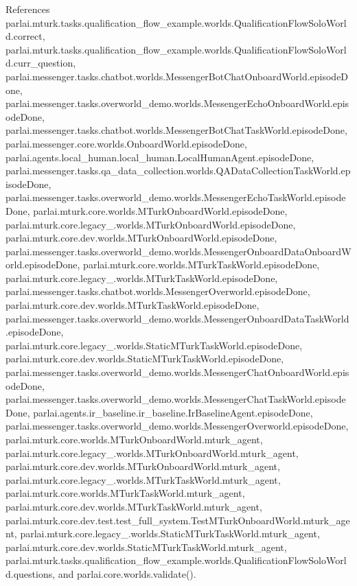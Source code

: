 References parlai.\+mturk.\+tasks.\+qualification\+\_\+flow\+\_\+example.\+worlds.\+Qualification\+Flow\+Solo\+World.\+correct, parlai.\+mturk.\+tasks.\+qualification\+\_\+flow\+\_\+example.\+worlds.\+Qualification\+Flow\+Solo\+World.\+curr\+\_\+question, parlai.\+messenger.\+tasks.\+chatbot.\+worlds.\+Messenger\+Bot\+Chat\+Onboard\+World.\+episode\+Done, parlai.\+messenger.\+tasks.\+overworld\+\_\+demo.\+worlds.\+Messenger\+Echo\+Onboard\+World.\+episode\+Done, parlai.\+messenger.\+tasks.\+chatbot.\+worlds.\+Messenger\+Bot\+Chat\+Task\+World.\+episode\+Done, parlai.\+messenger.\+core.\+worlds.\+Onboard\+World.\+episode\+Done, parlai.\+agents.\+local\+\_\+human.\+local\+\_\+human.\+Local\+Human\+Agent.\+episode\+Done, parlai.\+messenger.\+tasks.\+qa\+\_\+data\+\_\+collection.\+worlds.\+Q\+A\+Data\+Collection\+Task\+World.\+episode\+Done, parlai.\+messenger.\+tasks.\+overworld\+\_\+demo.\+worlds.\+Messenger\+Echo\+Task\+World.\+episode\+Done, parlai.\+mturk.\+core.\+worlds.\+M\+Turk\+Onboard\+World.\+episode\+Done, parlai.\+mturk.\+core.\+legacy\+\_.\+worlds.\+M\+Turk\+Onboard\+World.\+episode\+Done, parlai.\+mturk.\+core.\+dev.\+worlds.\+M\+Turk\+Onboard\+World.\+episode\+Done, parlai.\+messenger.\+tasks.\+overworld\+\_\+demo.\+worlds.\+Messenger\+Onboard\+Data\+Onboard\+World.\+episode\+Done, parlai.\+mturk.\+core.\+worlds.\+M\+Turk\+Task\+World.\+episode\+Done, parlai.\+mturk.\+core.\+legacy\+\_.\+worlds.\+M\+Turk\+Task\+World.\+episode\+Done, parlai.\+messenger.\+tasks.\+chatbot.\+worlds.\+Messenger\+Overworld.\+episode\+Done, parlai.\+mturk.\+core.\+dev.\+worlds.\+M\+Turk\+Task\+World.\+episode\+Done, parlai.\+messenger.\+tasks.\+overworld\+\_\+demo.\+worlds.\+Messenger\+Onboard\+Data\+Task\+World.\+episode\+Done, parlai.\+mturk.\+core.\+legacy\+\_.\+worlds.\+Static\+M\+Turk\+Task\+World.\+episode\+Done, parlai.\+mturk.\+core.\+dev.\+worlds.\+Static\+M\+Turk\+Task\+World.\+episode\+Done, parlai.\+messenger.\+tasks.\+overworld\+\_\+demo.\+worlds.\+Messenger\+Chat\+Onboard\+World.\+episode\+Done, parlai.\+messenger.\+tasks.\+overworld\+\_\+demo.\+worlds.\+Messenger\+Chat\+Task\+World.\+episode\+Done, parlai.\+agents.\+ir\+\_\+baseline.\+ir\+\_\+baseline.\+Ir\+Baseline\+Agent.\+episode\+Done, parlai.\+messenger.\+tasks.\+overworld\+\_\+demo.\+worlds.\+Messenger\+Overworld.\+episode\+Done, parlai.\+mturk.\+core.\+worlds.\+M\+Turk\+Onboard\+World.\+mturk\+\_\+agent, parlai.\+mturk.\+core.\+legacy\+\_.\+worlds.\+M\+Turk\+Onboard\+World.\+mturk\+\_\+agent, parlai.\+mturk.\+core.\+dev.\+worlds.\+M\+Turk\+Onboard\+World.\+mturk\+\_\+agent, parlai.\+mturk.\+core.\+legacy\+\_.\+worlds.\+M\+Turk\+Task\+World.\+mturk\+\_\+agent, parlai.\+mturk.\+core.\+worlds.\+M\+Turk\+Task\+World.\+mturk\+\_\+agent, parlai.\+mturk.\+core.\+dev.\+worlds.\+M\+Turk\+Task\+World.\+mturk\+\_\+agent, parlai.\+mturk.\+core.\+dev.\+test.\+test\+\_\+full\+\_\+system.\+Test\+M\+Turk\+Onboard\+World.\+mturk\+\_\+agent, parlai.\+mturk.\+core.\+legacy\+\_.\+worlds.\+Static\+M\+Turk\+Task\+World.\+mturk\+\_\+agent, parlai.\+mturk.\+core.\+dev.\+worlds.\+Static\+M\+Turk\+Task\+World.\+mturk\+\_\+agent, parlai.\+mturk.\+tasks.\+qualification\+\_\+flow\+\_\+example.\+worlds.\+Qualification\+Flow\+Solo\+World.\+questions, and parlai.\+core.\+worlds.\+validate().

